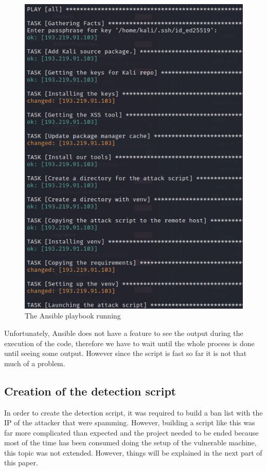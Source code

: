 \documentclass[a4paper,12pt,fleqn]{article}
\begin{document}
\begin{figure}[h]
    \centering
    \includegraphics[scale = 0.6]{images/attack_install.png}
    \caption{The Ansible playbook running}
\end{figure}

Unfortunately, Ansible does not have a feature to see the output during the execution of the code, therefore we have to wait until the whole process is done until seeing some output. However since the script is fast so far it is not that much of a problem.

\subsection{Creation of the detection script}

In order to create the detection script, it was required to build a ban list with the IP of the attacker that were spamming. However, building a script like this was far more complicated than expected and the project needed to be ended because most of the time has been consumed doing the setup of the vulnerable machine, this topic was not extended. However, things will be explained in the next part of this paper.
\end{document}
